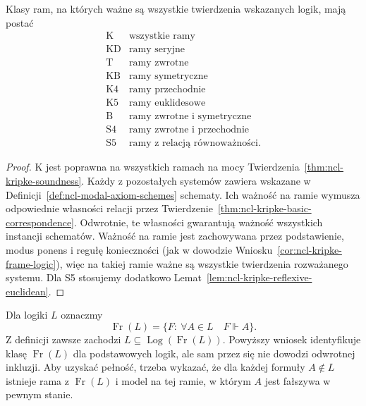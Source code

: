 \begin{wniosek}
\label{cor:ncl-kripke-basic-frame-classes}
Klasy ram, na których ważne są wszystkie
twierdzenia wskazanych logik, mają postać
\[
\begin{array}{c|l}
 \mathrm K & \text{wszystkie ramy}\\
 \mathrm{KD} & \text{ramy seryjne}\\
 \mathrm T & \text{ramy zwrotne}\\
 \mathrm{KB} & \text{ramy symetryczne}\\
 \mathrm{K4} & \text{ramy przechodnie}\\
 \mathrm{K5} & \text{ramy euklidesowe}\\
 \mathrm B & \text{ramy zwrotne i symetryczne}\\
 \mathrm{S4} & \text{ramy zwrotne i przechodnie}\\
 \mathrm{S5} & \text{ramy z relacją równoważności}.
\end{array}
\]
\end{wniosek}
\begin{proof}
K jest poprawna na wszystkich ramach na mocy
Twierdzenia~\ref{thm:ncl-kripke-soundness}.
Każdy z pozostałych systemów zawiera wskazane
w Definicji~\ref{def:ncl-modal-axiom-schemes}
schematy. Ich ważność na ramie wymusza
odpowiednie własności relacji przez
Twierdzenie~\ref{thm:ncl-kripke-basic-correspondence}.
Odwrotnie, te własności gwarantują ważność
wszystkich instancji schematów. Ważność
na ramie jest zachowywana przez podstawienie,
modus ponens i regułę konieczności
(jak w dowodzie Wniosku~\ref{cor:ncl-kripke-frame-logic}),
więc na takiej ramie ważne są wszystkie
twierdzenia rozważanego systemu.
Dla S5 stosujemy dodatkowo
Lemat~\ref{lem:ncl-kripke-reflexive-euclidean}.
\end{proof}

\begin{uwaga}
\label{rem:ncl-kripke-correspondence-not-completeness}
Dla logiki $L$ oznaczmy
\[
 \operatorname{Fr}(L)=\{F:\ \forall A\in L\quad F\Vdash A\}.
\]
Z definicji zawsze zachodzi
$L\subseteq\operatorname{Log}(\operatorname{Fr}(L))$.
Powyższy wniosek identyfikuje klasę
$\operatorname{Fr}(L)$ dla podstawowych logik,
ale sam przez się nie dowodzi odwrotnej inkluzji.
Aby uzyskać pełność, trzeba wykazać, że
dla każdej formuły $A\notin L$ istnieje
rama z $\operatorname{Fr}(L)$ i model na tej ramie,
w którym $A$ jest fałszywa w pewnym stanie.
\end{uwaga}

